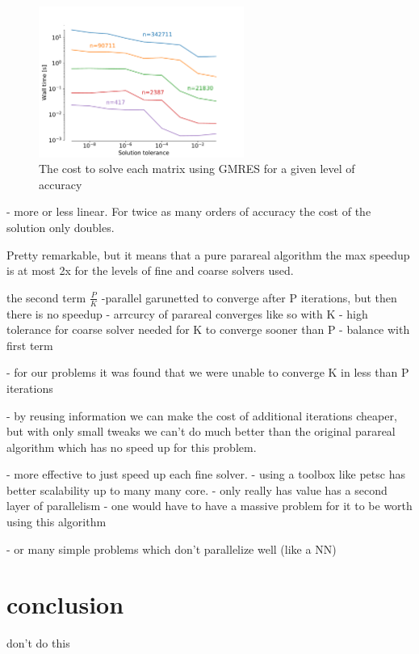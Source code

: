 \documentclass[conf]{new-aiaa}
\begin{document}
\begin{figure}[H]
	\centering
	\includegraphics[width=0.60\textwidth,keepaspectratio]{acc_timing.pdf}
	\caption{The cost to solve each matrix using GMRES for a given level of accuracy}
	\label{fig:acc_timing}
\end{figure}



- more or less linear. For twice as many orders of accuracy the cost of the solution only doubles.

Pretty remarkable, but it means that a pure parareal algorithm the max speedup is at most 2x for the levels of fine and coarse solvers used.

the second term $\frac{P}{K}$
-parallel garunetted to converge after P iterations, but then there is no speedup
- arrcurcy of parareal converges like so with K
- high tolerance for coarse solver needed for K to converge sooner than P
- balance with first term

- for our problems it was found that we were unable to converge K in less than P iterations


- by reusing information we can make the cost of additional iterations cheaper, but with only small tweaks we can't do much better than the original parareal algorithm which has no speed up for this problem.

- more effective to just speed up each fine solver.
- using a toolbox like petsc has better scalability up to many many core.
- only really has value has a second layer of parallelism
- one would have to have a massive problem for it to be worth using this algorithm

- or many simple problems which don't parallelize well (like a NN)

\section{conclusion}

don't do this



\end{document}
